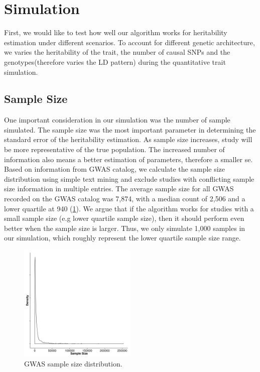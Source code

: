 	\section{Simulation}
		First, we would like to test how well our algorithm works for heritability estimation under different scenarios.
		To account for different genetic architecture, we varies the heritability of the trait, the number of causal \glspl{SNP} and the genotypes(therefore varies the \gls{LD} pattern) during the quantitative trait simulation.
		
		\subsection{Sample Size}
		One important consideration in our simulation was the number of sample simulated. 
		The sample size was the most important parameter in determining the standard error of the heritability estimation. 
		As sample size increases, study will be more representative of the true population. 
		The increased number of information also means a better estimation of parameters, therefore a smaller \acrfull{se}.
		Based on information from \gls{GWAS} catalog\citep{Welter2014}, we calculate the sample size distribution using simple text mining and exclude studies with conflicting sample size information in multiple entries. 
		The average sample size for all \gls{GWAS} recorded on the \gls{GWAS} catalog was 7,874, with a median count of 2,506 and a lower quartile at 940 (\cref{fig:gwasCata}). 
		We argue that if the algorithm works for studies with a small sample size (e.g lower quartile sample size), then it should perform even better when the sample size is larger. 
		Thus, we only simulate 1,000 samples in our simulation, which roughly represent the lower quartile sample size range.
		
		\begin{figure}
			\centering
			\includegraphics[width=0.5\textwidth]{figure/gwasSampleSize.png}
			\caption[GWAS Sample Size distribution]{
				\gls{GWAS} sample size distribution.
				}
			\label{fig:gwasCata}
		\end{figure}
		
